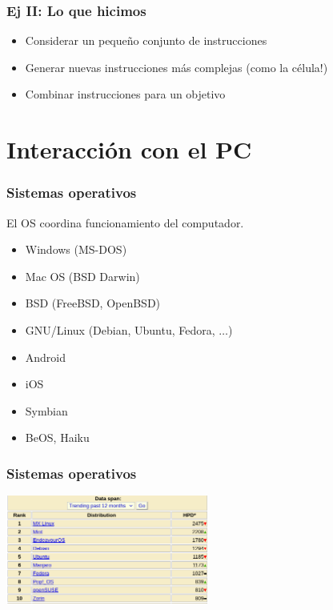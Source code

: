 \documentclass[14pt,aspectratio=169,xcolor=dvipsnames]{beamer}
\begin{document}
\begin{frame}\frametitle{Ej II: Lo que hicimos}
    \begin{itemize}
        \item Considerar un pequeño conjunto de instrucciones
        \item Generar nuevas instrucciones más complejas {\color{gray}(como la célula!)}
        \item Combinar instrucciones para un objetivo
    \end{itemize}
\end{frame}
\section{Interacción con el PC}
\begin{frame}\frametitle{Sistemas operativos}
El OS coordina funcionamiento del computador. \pause
    \begin{itemize}
        \item<+-> Windows (MS-DOS)
        \item<+-> Mac OS (BSD Darwin)
        \item<+-> BSD (FreeBSD, OpenBSD)
        \item<+-> GNU/Linux (Debian, Ubuntu, Fedora, $\hdots$)
        \item<+-> Android
        \item<+-> iOS
        \item<+-> Symbian
        \item<+-> BeOS, Haiku
    \end{itemize}
\end{frame}
\begin{frame}\frametitle{Sistemas operativos}
    \begin{center}
        \includegraphics[width=0.5\textwidth]{../images/distrowatch.png}
    \end{center}
\end{frame}
\end{document}
